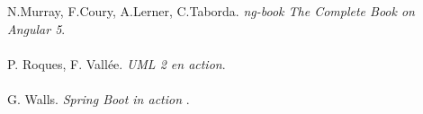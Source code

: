 %
\begin{thebibliography}{20}
 N.Murray, F.Coury, A.Lerner, C.Taborda. \textit{ng-book The Complete Book on Angular 5}.\\ \\
P. Roques, F. Vallée. \textit{UML 2 en action}.\\ \\
G. Walls. \textit{Spring Boot in action }.


\end{thebibliography}
